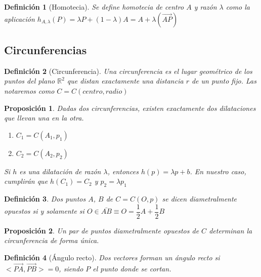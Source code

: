 \documentclass[11pt, a4paper, titlepage]{article}
\newcommand{\R}{\mathbb{R}}
\renewcommand{\vec}{\overrightarrow}
\theoremstyle{theorem-style}
\newtheorem*{nprop}{Proposición}
\theoremstyle{definition-style}
\newtheorem*{ndef}{Definición}
\theoremstyle{remark-style}
\newtheorem*{nota}{Nota}
\theoremstyle{example-style}
\begin{document}
\begin{ndef}[Homotecia]
  Se define homotecia de centro $A$ y razón $\lambda$ como la aplicación $h_{A,\lambda}(P) = \lambda P + (1-\lambda)A = A+\lambda(\vec{AP})$
\end{ndef}



\subsection{Circunferencias}

\begin{ndef}[Circunferencia]
  Una circunferencia es el lugar geométrico de los puntos del plano $\R^2$ que distan exactamente una distancia $r$ de un punto fijo. Las notaremos como $C = C(centro,radio)$
\end{ndef}

\begin{nprop}
  Dadas dos circunferencias, existen exactamente dos dilataciones que llevan una en la otra.
  \begin{enumerate}
  \item $C_1 = C(A_1,p_1)$
  \item $C_2 = C(A_2,p_2)$
  \end{enumerate}
  Si $h$ es una dilatación de razón $\lambda$, entonces $h(p) = \lambda p + b$.
  En nuestro caso, cumplirán que $h(C_1) = C_2$ y $p_2 = \lambda p_1$
\end{nprop}



\begin{ndef}
  Dos puntos $A$, $B$ de $C = C(O,p) $ se dicen diametralmente opuestos si y solamente si $O \in \bar{AB} \equiv O = \dfrac{1}{2}A + \dfrac{1}{2}B$
\end{ndef}


\begin{nprop}
  Un par de puntos diametralmente opuestos de $C$ determinan la circunferencia de forma única.
\end{nprop}

\begin{ndef}[Ángulo recto]
  Dos vectores forman un ángulo recto si $<\vec{PA},\vec{PB}> = 0$, siendo $P$ el punto donde se cortan.
\end{ndef}
\end{document}
